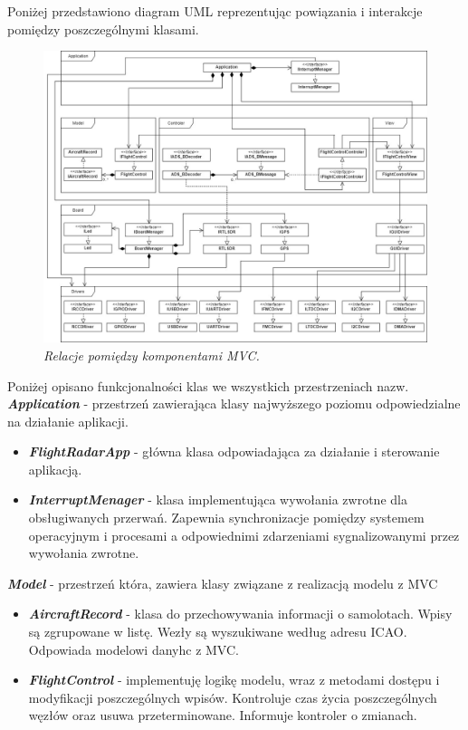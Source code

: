 \documentclass[eng,printmode]{mgr}
\begin{document}
Poniżej przedstawiono diagram UML reprezentując powiązania i interakcje pomiędzy poszczególnymi klasami.
\vskip 0.55cm
\begin{figure}[!h]
    \centering
    \includegraphics[height=\textwidth, angle=90]{plots/uml.png}
    \caption{\textit{\scriptsize Relacje pomiędzy komponentami MVC.}}
\end{figure}

\noindent
Poniżej opisano funkcjonalności klas we wszystkich przestrzeniach nazw.
\\


\noindent
\textbf{\textit{Application}} - przestrzeń zawierająca klasy najwyższego poziomu odpowiedzialne na działanie aplikacji.
\begin{itemize}[label={}]
  \item \textbf{\textit{FlightRadarApp}} - główna klasa odpowiadająca za działanie i sterowanie aplikacją.
  \item \textbf{\textit{InterruptMenager}} - klasa implementująca wywołania zwrotne dla obsługiwanych przerwań. Zapewnia synchronizacje pomiędzy systemem operacyjnym i procesami a odpowiednimi zdarzeniami sygnalizowanymi przez wywołania zwrotne.
\end{itemize}
\vskip 0.55cm

\noindent
\textbf{\textit{Model}} - przestrzeń która, zawiera klasy związane z realizacją modelu z MVC
\begin{itemize}[label={}]
  \item \textbf{\textit{AircraftRecord}} - klasa do przechowywania informacji o samolotach. Wpisy są zgrupowane w listę. Wezły są wyszukiwane według adresu ICAO. Odpowiada modelowi danyhc z MVC.
  \item \textbf{\textit{FlightControl}} - implementuję logikę modelu, wraz z metodami dostępu i modyfikacji poszczególnych wpisów. Kontroluje czas życia poszczególnych węzłów oraz usuwa przeterminowane. Informuje kontroler o zmianach.
\end{itemize}
\vskip 0.55cm
\end{document}
